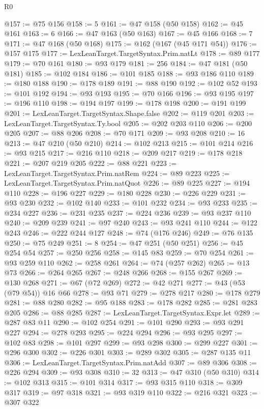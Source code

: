 \begin{lexlean}{R0}
\begin{coremodule}
@157 := @75 @156
@158 := 5
@161 := @47 @158 (@50 @158)
@162 := @45 @161
@163 := 6
@166 := @47 @163 (@50 @163)
@167 := @45 @166
@168 := 7
@171 := @47 @168 (@50 @168)
@175 := @162 (@167 (@45 @171 @54))
@176 := @157 @175
@177 := LexLeanTarget.TargetSyntax.Prim.natLt
@178 := @89 @177
@179 := @70 @161
@180 := @93 @179
@181 := 256
@184 := @47 @181 (@50 @181)
@185 := @102 @184
@186 := @101 @185
@188 := @93 @186 @110
@189 := @180 @188
@190 := @178 @189
@191 := @88 @190
@192 := @102 @52
@193 := @101 @192
@194 := @93 @193
@195 := @70 @166
@196 := @93 @195
@197 := @196 @110
@198 := @194 @197
@199 := @178 @198
@200 := @191 @199
@201 := LexLeanTarget.TargetSyntax.Shape.false
@202 := @119 @201
@203 := LexLeanTarget.TargetSyntax.Ty.bool
@205 := @202 @203 @110
@206 := @200 @205
@207 := @88 @206
@208 := @70 @171
@209 := @93 @208
@210 := 16
@213 := @47 @210 (@50 @210)
@214 := @102 @213
@215 := @101 @214
@216 := @93 @215
@217 := @216 @110
@218 := @209 @217
@219 := @178 @218
@221 := @207 @219 @205
@222 := @88 @221
@223 := LexLeanTarget.TargetSyntax.Prim.natRem
@224 := @89 @223
@225 := LexLeanTarget.TargetSyntax.Prim.natQuot
@226 := @89 @225
@227 := @194 @110
@228 := @196 @227
@229 := @180 @228
@230 := @226 @229
@231 := @93 @230
@232 := @102 @140
@233 := @101 @232
@234 := @93 @233
@235 := @234 @227
@236 := @231 @235
@237 := @224 @236
@239 := @93 @237 @110
@240 := @209 @239
@241 := @97 @240
@243 := @93 @241 @110
@244 := @122 @243
@246 := @222 @244 @127
@248 := @74 (@176 @246)
@249 := @76 @135
@250 := @75 @249
@251 := 8
@254 := @47 @251 (@50 @251)
@256 := @45 @254 @54
@257 := @250 @256
@258 := @145 @83
@259 := @70 @254
@261 := @93 @259 @110
@262 := @258 @261
@264 := @74 (@257 @262)
@265 := @13 @73
@266 := @264 @265
@267 := @248 @266
@268 := @155 @267
@269 := @130 @268
@271 := @67 (@72 @269)
@272 := @42 @271
@277 := @43 (@53 (@79 @54)) @16 @66
@278 := @93 @71
@279 := @278 @217
@280 := @178 @279
@281 := @88 @280
@282 := @95 @188
@283 := @178 @282
@285 := @281 @283 @205
@286 := @88 @285
@287 := LexLeanTarget.TargetSyntax.Expr.let
@289 := @287 @83 @11
@290 := @102 @254
@291 := @101 @290
@293 := @93 @291 @227
@294 := @278 @293
@295 := @224 @294
@296 := @93 @295
@297 := @102 @83
@298 := @101 @297
@299 := @93 @298
@300 := @299 @227
@301 := @296 @300
@302 := @226 @301
@303 := @289 @302
@305 := @287 @135 @11
@306 := LexLeanTarget.TargetSyntax.Prim.natAdd
@307 := @89 @306
@308 := @226 @294
@309 := @93 @308
@310 := 32
@313 := @47 @310 (@50 @310)
@314 := @102 @313
@315 := @101 @314
@317 := @93 @315 @110
@318 := @309 @317
@319 := @97 @318
@321 := @93 @319 @110
@322 := @216 @321
@323 := @307 @322

\end{coremodule}
\end{lexlean}
